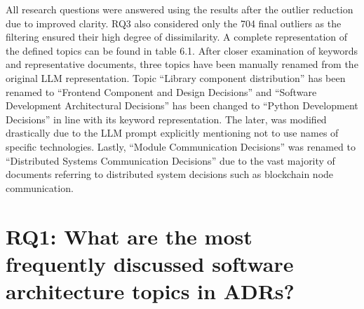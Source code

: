         All research questions were answered using the results after the outlier reduction due to improved clarity. RQ3 also considered only the 704 final outliers as the filtering ensured their high degree of dissimilarity. A complete representation of the defined topics can be found in table 6.1.
        After closer examination of keywords and representative documents, three topics have been manually renamed from the original LLM representation. Topic ``Library component distribution'' has been renamed to ``Frontend Component and Design Decisions'' and ``Software Development Architectural Decisions'' has been changed to ``Python Development Decisions'' in line with its keyword representation. The later, was modified drastically due to the LLM prompt explicitly mentioning not to use names of specific technologies. Lastly, ``Module Communication Decisions'' was renamed to ``Distributed Systems Communication Decisions'' due to the vast majority of documents referring to distributed system decisions such as blockchain node communication.
        
        

    \section{RQ1: What are the most frequently discussed software architecture topics in ADRs?}

